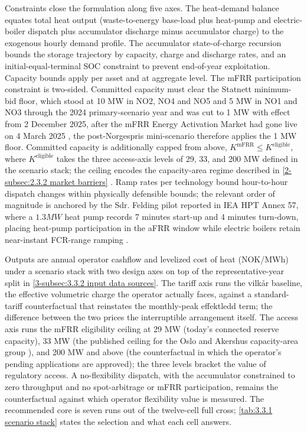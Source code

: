 Constraints close the formulation along five axes. The heat-demand balance equates total heat output (waste-to-energy base-load plus heat-pump and electric-boiler dispatch plus accumulator discharge minus accumulator charge) to the exogenous hourly demand profile. The accumulator state-of-charge recursion bounds the storage trajectory by capacity, charge and discharge rates, and an initial-equal-terminal SOC constraint to prevent end-of-year exploitation. Capacity bounds apply per asset and at aggregate level. The mFRR participation constraint is two-sided. Committed capacity must clear the Statnett minimum-bid floor, which stood at 10 MW in NO2, NO4 and NO5 and 5 MW in NO1 and NO3 through the 2024 primary-scenario year \cite{dalen_fleksibilitet_nodate} and was cut to 1 MW with effect from 2 December 2025, after the mFRR Energy Activation Market had gone live on 4 March 2025 \cite{solberg_manedsrapport_nodate}, \cite{statnett_1_2025} the post-Norgespris mini-scenario therefore applies the 1 MW floor. Committed capacity is additionally capped from above, $K^{\text{mFRR}} \leq K^{\text{eligible}}$, where $K^{\text{eligible}}$ takes the three access-axis levels of 29, 33, and 200 MW defined in the scenario stack; the ceiling encodes the capacity-area regime described in \autoref{2-subsec:2.3.2 market barriers} \cite{statnett_innforing_2026}. Ramp rates per technology bound hour-to-hour dispatch changes within physically defensible bounds; the relevant order of magnitude is anchored by the Sdr. Felding pilot reported in IEA HPT Annex 57, where a $1.3 MW$ heat pump records  7 minutes start-up and  4 minutes turn-down, placing heat-pump participation in the aFRR window while electric boilers retain near-instant FCR-range ramping \cite{v_pedersen_annex_2024}.

Outputs are annual operator cashflow and levelized cost of heat (NOK/MWh) under a scenario stack with two design axes on top of the representative-year split in \autoref{3-subsec:3.3.2 input data sources}. The tariff axis runs the vilkår baseline, the effective volumetric charge the operator actually faces, against a standard-tariff counterfactual that reinstates the monthly-peak effektledd term; the difference between the two prices the interruptible arrangement itself. The access axis runs the mFRR eligibility ceiling at 29 MW (today's connected reserve capacity), 33 MW (the published ceiling for the Oslo and Akershus capacity-area group \cite{statnett_innforing_2026}), and 200 MW and above (the counterfactual in which the operator's pending applications are approved); the three levels bracket the value of regulatory access. A no-flexibility dispatch, with the accumulator constrained to zero throughput and no spot-arbitrage or mFRR participation, remains the counterfactual against which operator flexibility value is measured. The recommended core is seven runs out of the twelve-cell full cross; \autoref{tab:3.3.1 scenario stack} states the selection and what each cell answers.

